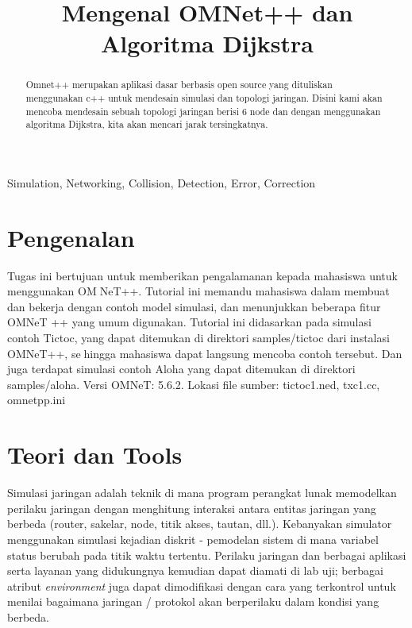 \documentclass[conference]{IEEEtran}
\begin{document}
\title{Mengenal OMNet++ dan Algoritma Dijkstra}

\author{
  \and
}
\maketitle

\begin{abstract}
  Omnet++ merupakan aplikasi dasar berbasis open source yang dituliskan menggunakan c++ untuk mendesain simulasi dan topologi jaringan. Disini kami akan mencoba mendesain sebuah topologi jaringan berisi 6 node dan dengan menggunakan algoritma Dijkstra, kita akan mencari jarak tersingkatnya.

\end{abstract}

\begin{IEEEkeywords}
  Simulation, Networking, Collision, Detection, Error, Correction
\end{IEEEkeywords}

\section{Pengenalan}
Tugas ini bertujuan untuk memberikan pengalamanan kepada mahasiswa untuk menggunakan OMNeT++. Tutorial ini memandu mahasiswa dalam membuat dan bekerja dengan contoh model simulasi,
dan menunjukkan beberapa fitur OMNeT ++ yang umum digunakan. Tutorial ini didasarkan pada
simulasi contoh Tictoc, yang dapat ditemukan di direktori samples/tictoc dari instalasi OMNeT++, sehingga mahasiswa dapat langsung mencoba contoh tersebut. Dan juga terdapat simulasi contoh Aloha yang dapat ditemukan di direktori samples/aloha. Versi OMNeT: 5.6.2. Lokasi file sumber:
tictoc1.ned, txc1.cc, omnetpp.ini

\section{Teori dan Tools}\label{teori-tool}
Simulasi jaringan adalah teknik di mana program perangkat lunak memodelkan perilaku jaringan dengan menghitung interaksi antara entitas jaringan yang berbeda (router, sakelar, node, titik akses, tautan, dll.). Kebanyakan simulator menggunakan simulasi kejadian diskrit - pemodelan sistem di mana variabel status berubah pada titik waktu tertentu. Perilaku jaringan dan berbagai aplikasi serta layanan yang didukungnya kemudian dapat diamati di lab uji; berbagai atribut \textit{environment} juga dapat dimodifikasi dengan cara yang terkontrol untuk menilai bagaimana jaringan / protokol akan berperilaku dalam kondisi yang berbeda.
\end{document}
